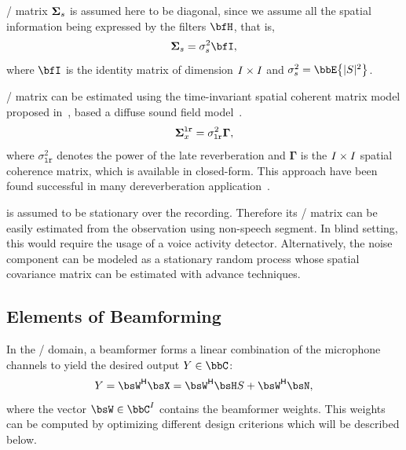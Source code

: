  \xPSD/ matrix $\boldsymbol{\Sigma}_{s}$ is assumed here to be diagonal, since we assume all the spatial information being expressed by the filters $\FLTSS$, that is,
\begin{equation}
    \xpsd_\src = \sigma_\src^2 \bfI
    ,
\end{equation}
where $\bfI$ is the identity matrix of dimension $I \times I$ and $\sigma_\src^2 = \bbE\kbrace{\powerOf{\SRC}}$.

 \xPSD/ matrix can be estimated using the time-invariant spatial coherent matrix model proposed in~, based a diffuse sound field model~.
\begin{equation}\label{eq:dechorateapp:gamma}
    \boldsymbol{\Sigma}^{\mathtt{lr}}_{x} = \sigma_\mathtt{lr}^2\mathbf{\Gamma}
    ,
\end{equation}
where $\sigma_\mathtt{lr}^2$ denotes the power of the late reverberation and $\mathbf{\Gamma}$ is the $I \times I$ spatial coherence matrix, which is available in closed-form.
This approach have been found successful in many dereverberation application~.

 is assumed to be stationary over the recording.
Therefore its \xPSD/ matrix can be easily estimated from the observation using non-speech segment.
In blind setting, this would require the usage of a voice activity detector.
Alternatively, the noise component can be modeled as a stationary random process whose spatial covariance matrix can be estimated with advance techniques.

\subsection{Elements of Beamforming}\label{subsec:dechorateapp:beamformers}
In the \STFT/ domain, a beamformer forms a linear combination of the microphone channels to yield the desired output $Y \in \bbC$:
\begin{equation*}
    Y = \khermitian{\bsW} \MICS = \khermitian{\bsW} \FLTS \SRC + \khermitian{\bsW} \NSES,
\end{equation*}
where the vector $\bsW \in \bbC^{\numMics}$ contains the beamformer weights.
This weights can be computed by optimizing different design criterions which will be described below.

